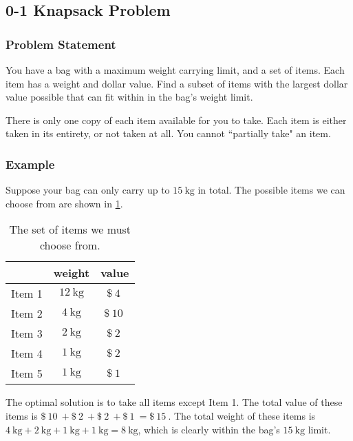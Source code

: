 \subsection{0-1 Knapsack Problem}%
\label{sub:0-1-knapsack-problem}


\subsubsection{Problem Statement}

You have a bag with a maximum weight carrying limit, and a set of items. Each item has a weight and dollar value. Find a subset of items with the largest dollar value possible that can fit within in the bag's weight limit.

There is only one copy of each item available for you to take. Each item is either taken in its entirety, or not taken at all. You cannot ``partially take" an item.


\subsubsection{Example}
\label{ssub:0-1-knapsack-problem--example}

Suppose your bag can only carry up to $\qty{15}{\kilo\gram}$ in total. The possible items we can choose from are shown in \cref{tab:0-1-knapsack-problem--example-items}.

\begin{table}[H]
    \centering
    \caption{The set of items we must choose from.}
    \label{tab:0-1-knapsack-problem--example-items}
    \begin{tabular}{l||c|c}
        & weight & value \\ \hline\hline
        Item 1 & $\qty{12}{\kilo\gram}$ & $\SI{4}[\$]{}$ \\ \hline
        Item 2 & $\qty{4}{\kilo\gram}$ & $\SI{10}[\$]{}$ \\ \hline
        Item 3 & $\qty{2}{\kilo\gram}$ & $\SI{2}[\$]{}$ \\ \hline
        Item 4 & $\qty{1}{\kilo\gram}$ & $\SI{2}[\$]{}$ \\ \hline
        Item 5 & $\qty{1}{\kilo\gram}$ & $\SI{1}[\$]{}$ \\ \hline
    \end{tabular}
\end{table}

The optimal solution is to take all items except Item 1. The total value of these items is $\SI{10}[\$]{} + \SI{2}[\$]{} + \SI{2}[\$]{} + \SI{1}[\$]{} = \SI{15}[\$]{}$. The total weight of these items is $\qty{4}{\kilo\gram} + \qty{2}{\kilo\gram} + \qty{1}{\kilo\gram} + \qty{1}{\kilo\gram} = \qty{8}{\kilo\gram}$, which is clearly within the bag's $\qty{15}{\kilo\gram}$ limit.

